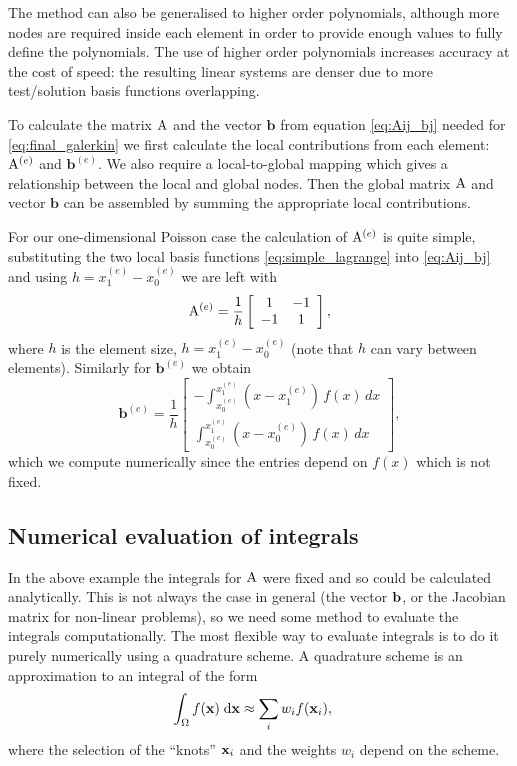 The method can also be generalised to higher order polynomials, although more nodes are required inside each element in order to provide enough values to fully define the polynomials.
The use of higher order polynomials increases accuracy at the cost of speed: the resulting linear systems are denser due to more test/solution basis functions overlapping. 

To calculate the matrix $\mathrm{A}$ and the vector $\mathbf{b}$ from equation \cref{eq:Aij_bj} needed for \cref{eq:final_galerkin} we first calculate the local contributions from each element: $\mathrm{A}^{(e)}$ and $\mathbf{b}^{(e)}$.
We also require a local-to-global mapping which gives a relationship between the local and global nodes. 
Then the global matrix $\mathrm{A}$ and vector $\mathbf{b}$ can be assembled by summing the appropriate local contributions.

For our one-dimensional Poisson case the calculation of $\mathrm{A}^{(e)}$ is quite
simple, substituting the two local basis functions \cref{eq:simple_lagrange} into
\cref{eq:Aij_bj} and using $h=x_{1}^{(e)}-x_{0}^{(e)}$ we are left with
\begin{equation}
  \mathrm{A}^{(e)} = \dfrac{1}{h}
  \left[
    \begin{array}{cc}
      1 & -1 \\ -1 & 1
    \end{array}
  \right],
\end{equation}
where $h$ is the element size, $h = x_{1}^{(e)}-x_{0}^{(e)}$ (note that $h$ can vary between elements).
Similarly for $\mathbf{b}^{(e)}$ we obtain
\begin{equation}
  \mathbf{b}^{(e)}=\dfrac{1}{h}\left[
    \begin{array}{c}
      -\int_{x_{0}^{(e)}}^{x_{1}^{(e)}}(x-x_{1}^{(e)})\, f(x)\, dx\\
      \int_{x_{0}^{(e)}}^{x_{1}^{(e)}}(x-x_{0}^{(e)})\, f(x)\, dx
    \end{array}\right],
\end{equation}
which we compute numerically since the entries depend on $f(x)$ which is not fixed.



\subsection{Numerical evaluation of integrals}
\label{sec:numer-eval-integrals}

In the above example the integrals for $\mathrm{A}$ were fixed and so could be calculated analytically.
This is not always the case in general (\eg the vector ${\mathbf{b}}$, or the Jacobian matrix for non-linear problems), so we need some method to evaluate the integrals computationally.
The most flexible way to evaluate integrals is to do it purely numerically using a quadrature scheme.
A quadrature scheme is an approximation to an integral of the form
\begin{equation}
  \begin{aligned}
    {\int_{\Omega} {f(\mathbf{x})} {\; \mathrm{{d}}}\mathbf{x}} &\approx  \sum_i w_i f(\mathbf{x}_i),
  \end{aligned}
\end{equation}
where the selection of the ``knots'' $\mathbf{x}_i$ and the weights $w_i$ depend on the scheme.

